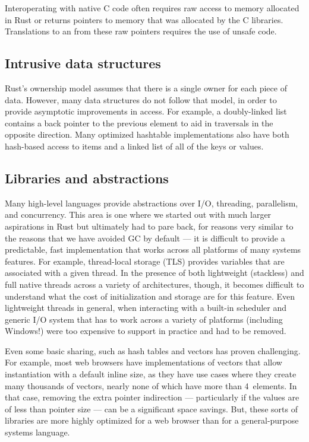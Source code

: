Interoperating with native C code often requires raw access to memory allocated in Rust or returns
pointers to memory that was allocated by the C libraries.
Translations to an from these raw pointers requires the use of unsafe code.

\subsection{Intrusive data structures}

Rust's ownership model assumes that there is a single owner for each piece of data.
However, many data structures do not follow that model, in order to provide asymptotic
improvements in access.
For example, a doubly-linked list contains a back pointer to the previous element to aid
in traversals in the opposite direction.
Many optimized hashtable implementations also have both hash-based access to items
and a linked list of all of the keys or values.
\subsection{Libraries and abstractions}
\label{sec:libraries}

Many high-level languages provide abstractions over I/O, threading, parallelism, and concurrency.
This area is one where we started out with much larger aspirations in Rust but ultimately had to pare back,
for reasons very similar to the reasons that we have avoided GC by default --- it is difficult to provide a
predictable, fast implementation that works across all platforms of many systems features.
For example, thread-local storage (TLS) provides variables that are associated with a given thread.
In the presence of both lightweight (stackless) and full native threads across a variety of architectures, though,
it becomes difficult to understand what the cost of initialization and storage are for this feature.
Even lightweight threads in general, when interacting with a built-in scheduler and generic I/O system that
has to work across a variety of platforms (including Windows!) were too expensive to support in practice and
had to be removed.

Even some basic sharing, such as hash tables and vectors has proven challenging.
For example, most web browsers have implementations of vectors that allow instantiation with a default inline size,
as they have use cases where they create many thousands of vectors, nearly none of which have more than 4~elements.
In that case, removing the extra pointer indirection --- particularly if the values are of less than pointer size ---
can be a significant space savings.
But, these sorts of libraries are more highly optimized for a web browser than for a general-purpose systems language.

